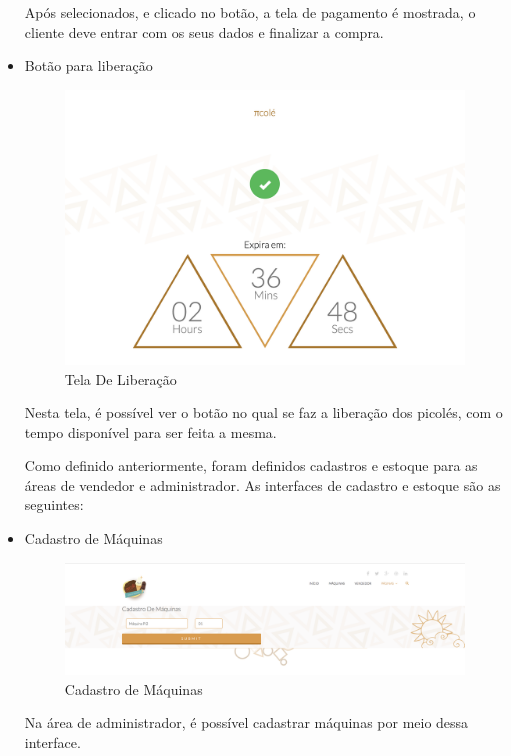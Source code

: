 \begin{itemize}
Após selecionados, e clicado no botão, a tela de pagamento é mostrada, o cliente deve entrar com os seus dados e finalizar a compra.

\item{Botão para liberação}

\begin{figure}[H]
	\centering
    \includegraphics[width=\textwidth]{figuras/botao}
    \caption{Tela De Liberação}
    \label{fig:Tela de pagamento}
\end{figure}

Nesta tela, é possível ver o botão no qual se faz a liberação dos picolés, com o tempo disponível para ser feita a mesma.


Como definido anteriormente, foram definidos cadastros e estoque para as áreas de vendedor e administrador. As interfaces de cadastro e estoque são as seguintes:

\item{Cadastro de Máquinas}

\begin{figure}[H]
	\centering
    \includegraphics[width=\textwidth]{figuras/cadastroMaquinas}
    \caption{Cadastro de Máquinas}
    \label{fig:CadastroMaquinas}
\end{figure}

Na área de administrador, é possível cadastrar máquinas por meio dessa interface.


\end{itemize}
